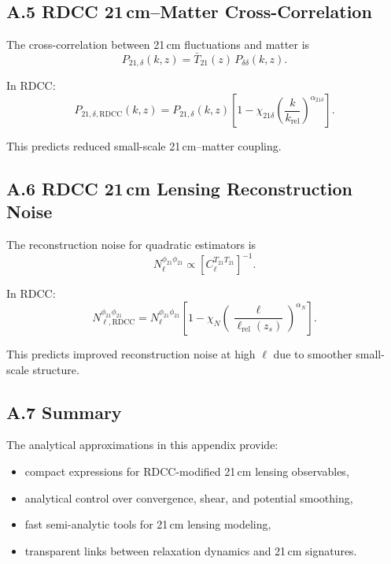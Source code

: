 \documentclass[11pt,a4paper]{article}
\begin{document}
\subsection*{A.5 RDCC 21\,cm–Matter Cross-Correlation}

The cross-correlation between 21\,cm fluctuations and matter is
\begin{equation}
P_{21,\delta}(k,z)
=
\bar{T}_{21}(z)\,
P_{\delta\delta}(k,z).
\end{equation}

In RDCC:
\begin{equation}
P_{21,\delta,\mathrm{RDCC}}(k,z)
=
P_{21,\delta}(k,z)
\left[
1
-
\chi_{21\delta}
\left(
\frac{k}{k_{\mathrm{rel}}}
\right)^{\alpha_{21\delta}}
\right].
\end{equation}

This predicts reduced small-scale 21\,cm–matter coupling.

\subsection*{A.6 RDCC 21\,cm Lensing Reconstruction Noise}

The reconstruction noise for quadratic estimators is
\begin{equation}
N_{\ell}^{\phi_{21}\phi_{21}}
\propto
\left[
C_{\ell}^{T_{21}T_{21}}
\right]^{-1}.
\end{equation}

In RDCC:
\begin{equation}
N_{\ell,\mathrm{RDCC}}^{\phi_{21}\phi_{21}}
=
N_{\ell}^{\phi_{21}\phi_{21}}
\left[
1
-
\chi_{N}
\left(
\frac{\ell}{\ell_{\mathrm{rel}}(z_{s})}
\right)^{\alpha_{N}}
\right].
\end{equation}

This predicts improved reconstruction noise at high $\ell$ due to smoother small-scale structure.

\subsection*{A.7 Summary}

The analytical approximations in this appendix provide:
\begin{itemize}
\item compact expressions for RDCC-modified 21\,cm lensing observables,
\item analytical control over convergence, shear, and potential smoothing,
\item fast semi-analytic tools for 21\,cm lensing modeling,
\item transparent links between relaxation dynamics and 21\,cm signatures.
\end{itemize}
\end{document}
